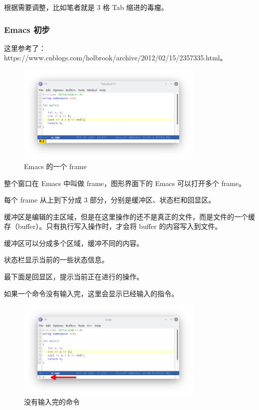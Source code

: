 \documentclass[UTF-8]{ctexart}
\begin{document}
				根据需要调整，比如笔者就是 3 格 Tab 缩进的毒瘤。
				
			\subsubsection{Emacs 初步}
				
				这里参考了：https://www.cnblogs.com/holbrook/archive/2012/02/15/2357335.html。
				
				\begin{figure}[H]
					\centering
					\includegraphics[width=0.8\textwidth]{fig/emacs_teach_frame.png}
					\caption*{Emacs 的一个 frame}
				\end{figure}
			
				整个窗口在 Emacs 中叫做 frame，图形界面下的 Emacs 可以打开多个 frame。
				
				每个 frame 从上到下分成 3 部分，分别是缓冲区、状态栏和回显区。
				
				缓冲区是编辑的主区域，但是在这里操作的还不是真正的文件，而是文件的一个缓存（buffer）。只有执行写入操作时，才会将 buffer 的内容写入到文件。
				
				缓冲区可以分成多个区域，缓冲不同的内容。
				
				状态栏显示当前的一些状态信息。
				
				最下面是回显区，提示当前正在进行的操作。
				
				如果一个命令没有输入完，这里会显示已经输入的指令。
				
				\begin{figure}[H]
					\centering
					\includegraphics[width=0.8\textwidth]{fig/emacs_teach_c_x.png}
					\caption*{没有输入完的命令}
				\end{figure}
			
\end{document}
